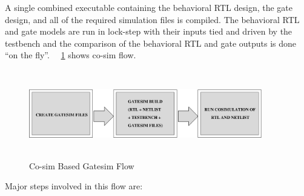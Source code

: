  A single combined executable containing the behavioral RTL design, the gate design, and all of the required simulation files is compiled. The behavioral RTL and gate models are run in lock-step with their inputs tied and driven by the testbench and the comparison of the behavioral RTL and gate outputs is done ``on the fly''. ~\figurename{~\ref{fig:cosim_flow.eps}} shows co-sim flow.




\begin{figure}[H]
\centering
\includegraphics[width=4in, height=1.5in]{./figures/cosim_flow.eps}
\caption{Co-sim Based Gatesim Flow}
\label{fig:cosim_flow.eps}
\end{figure}

Major steps involved in this flow are:


